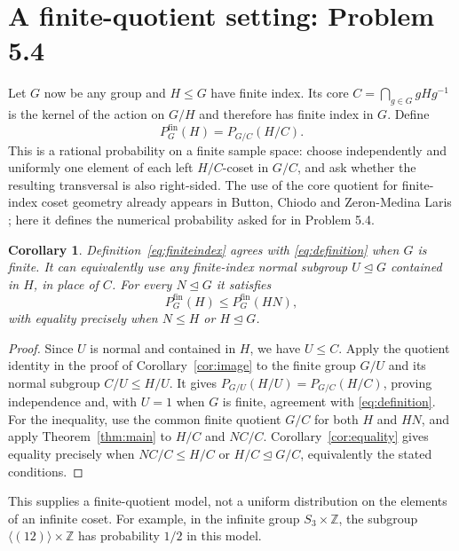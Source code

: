 \documentclass[11pt]{article}
\newtheorem{corollary}[theorem]{Corollary}
\newcommand{\PP}{P}
\begin{document}
\section{A finite-quotient setting: Problem 5.4}
Let $G$ now be any group and $H\leq G$ have finite index. Its core
$C=\bigcap_{g\in G}gHg^{-1}$ is the kernel of the action on $G/H$ and
therefore has finite index in $G$. Define
\begin{equation}\label{eq:finiteindex}
 \PP^{\mathrm{fin}}_G(H)=\PP_{G/C}(H/C).
\end{equation}
This is a rational probability on a finite sample space: choose independently
and uniformly one element of each left $H/C$-coset in $G/C$, and ask whether
the resulting transversal is also right-sided. The use of the core quotient
for finite-index coset geometry already appears in Button, Chiodo and
Zeron-Medina Laris \cite[p.~1 and Proposition 6]{BCZ}; here it defines the
numerical probability asked for in Problem 5.4.

\begin{corollary}\label{cor:finiteindex}
Definition~\eqref{eq:finiteindex} agrees with \eqref{eq:definition} when
$G$ is finite. It can equivalently use any finite-index normal subgroup
$U\trianglelefteq G$ contained in $H$, in place of $C$.
For every $N\trianglelefteq G$ it satisfies
\[
 \PP^{\mathrm{fin}}_G(H)\leq\PP^{\mathrm{fin}}_G(HN),
\]
with equality precisely when $N\leq H$ or $H\trianglelefteq G$.
\end{corollary}
\begin{proof}
Since $U$ is normal and contained in $H$, we have $U\leq C$.
Apply the quotient identity in the proof of Corollary~\ref{cor:image} to
the finite group $G/U$ and its normal subgroup $C/U\leq H/U$.
It gives $\PP_{G/U}(H/U)=\PP_{G/C}(H/C)$, proving independence and,
with $U=1$ when $G$ is finite, agreement with \eqref{eq:definition}.
For the inequality, use the common finite quotient $G/C$ for both $H$ and
$HN$, and apply Theorem~\ref{thm:main} to $H/C$ and $NC/C$.
Corollary~\ref{cor:equality} gives equality precisely when
$NC/C\leq H/C$ or $H/C\trianglelefteq G/C$, equivalently the stated conditions.
\end{proof}
This supplies a finite-quotient model, not a uniform distribution on the
elements of an infinite coset. For example, in the infinite group
$S_3\times\mathbb Z$, the subgroup
$\langle(12)\rangle\times\mathbb Z$ has probability $1/2$ in this model.
\end{document}

